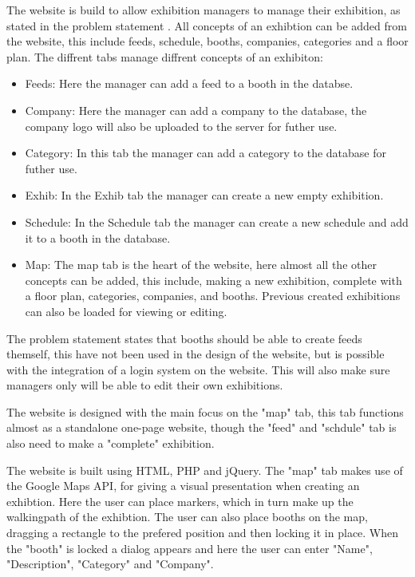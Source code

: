 The website is build to allow exhibition managers to manage their exhibition, as stated in the problem statement . All concepts of an exhibtion can be added from the website, this include feeds, schedule, booths, companies, categories and a floor plan.
The diffrent tabs manage diffrent concepts of an exhibiton:


\begin{itemize}
	\item Feeds: Here the manager can add a feed to a booth in the databse.
	\item Company: Here the manager can add a company to the database, the company logo will also be uploaded to the server for futher use.
	\item Category: In this tab the manager can add a category to the database for futher use.
	\item Exhib: In the Exhib tab the manager can create a new empty exhibition.
	\item Schedule: In the Schedule tab the manager can create a new schedule and add it to a booth in the database.
	\item Map: The map tab is the heart of the website, here almost all the other concepts can be added, this include, making a new exhibition, complete with a floor plan, categories, companies, and booths. Previous created exhibitions can also be loaded for viewing or editing.
\end{itemize}


The problem statement  states that booths should be able to create feeds themself, this have not been used in the design of the website, but is possible with the integration of a login system on the website. This will also make sure managers only will be able to edit their own exhibitions.


The website is designed with the main focus on the "map" tab, this tab functions almost as a standalone one-page website, though the "feed" and "schdule" tab is also need to make a "complete" exhibition.


The website is built using HTML, PHP and jQuery. The "map" tab makes use of the Google Maps API, for giving a visual presentation when creating an exhibtion.
Here the user can place markers, which in turn make up the walkingpath of the exhibtion. The user can also place booths on the map, dragging a rectangle to the prefered position and then locking it in place. When the "booth" is locked a dialog appears and here the user can enter "Name", "Description", "Category" and "Company".


